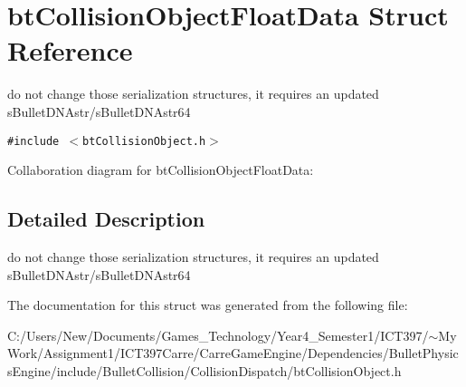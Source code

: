 \hypertarget{structbt_collision_object_float_data}{
\section{btCollisionObjectFloatData Struct Reference}
\label{structbt_collision_object_float_data}
}
do not change those serialization structures, it requires an updated sBulletDNAstr/sBulletDNAstr64  


{\tt \#include $<$btCollisionObject.h$>$}

Collaboration diagram for btCollisionObjectFloatData:

\subsection{Detailed Description}
do not change those serialization structures, it requires an updated sBulletDNAstr/sBulletDNAstr64 

The documentation for this struct was generated from the following file:\begin{CompactItemize}
\item 
C:/Users/New/Documents/Games\_\-Technology/Year4\_\-Semester1/ICT397/$\sim$My Work/Assignment1/ICT397Carre/CarreGameEngine/Dependencies/BulletPhysicsEngine/include/BulletCollision/CollisionDispatch/btCollisionObject.h\end{CompactItemize}
